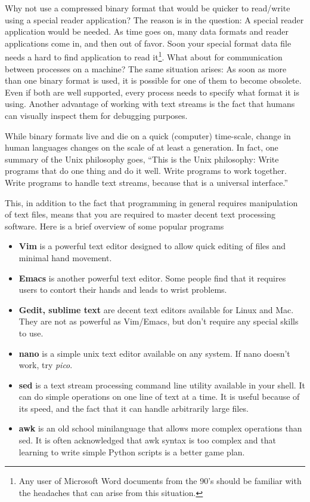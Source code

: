 Why not use a compressed binary format that would be quicker to read/write using a special reader application?  The reason is in the question:  A special reader application would be needed.  As time goes on, many data formats and reader applications come in, and then out of favor.  Soon your special format data file needs a hard to find application to read it\footnote{Any user of Microsoft Word documents from the 90's should be familiar with the headaches that can arise from this situation.}.  What about for communication between processes on a machine?  The same situation arises:  As soon as more than one binary format is used, it is possible for one of them to become obsolete.  Even if both are well supported, every process needs to specify what format it is using.  Another advantage of working with text streams is the fact that humans can visually inspect them for debugging purposes.

While binary formats live and die on a quick (computer) time-scale, change in human languages changes on the scale of at least a generation.  In fact, one summary of the Unix philosophy goes, ``This is the Unix philosophy: Write programs that do one thing and do it well. Write programs to work together. Write programs to handle text streams, because that is a universal interface.''

This, in addition to the fact that programming in general requires manipulation of text files, means that you are required to master decent text processing software.  Here is a brief overview of some popular programs
\begin{itemize}
  \item {\bf Vim} is a powerful text editor designed to allow quick editing of files and minimal hand movement.
  \item {\bf Emacs} is another powerful text editor.  Some people find that it requires users to contort their hands and leads to wrist problems.
  \item {\bf Gedit, sublime text} are decent text editors available for Linux and Mac.  They are not as powerful as Vim/Emacs, but don't require any special skills to use.
  \item {\bf nano} is a simple unix text editor available on any system.  If nano doesn't work, try \emph{pico}.
  \item {\bf sed} is a text stream processing command line utility available in your shell.  It can do simple operations on one line of text at a time.  It is useful because of its speed, and the fact that it can handle arbitrarily large files.
  \item {\bf awk} is an old school minilanguage that allows more complex operations than sed.  It is often acknowledged that awk syntax is too complex and that learning to write simple Python scripts is a better game plan.
\end{itemize}
